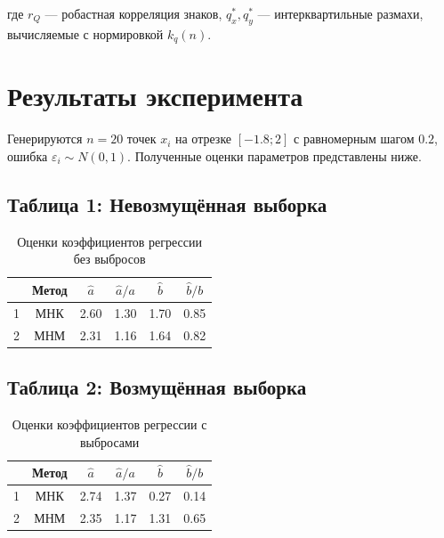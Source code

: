\documentclass[a4paper]{article}
\begin{document}
    где $r_Q$ — робастная корреляция знаков, $q_x^*, q_y^*$ — интерквартильные размахи, вычисляемые с нормировкой $k_q(n)$.


    \section{Результаты эксперимента}

    Генерируются $n=20$ точек $x_i$ на отрезке $[-1.8; 2]$ с равномерным шагом $0.2$, ошибка $\varepsilon_i \sim N(0, 1)$. Полученные оценки параметров представлены ниже.

    \subsection*{Таблица 1: Невозмущённая выборка}

    \begin{table}[H]
        \centering
        \begin{tabular}{|c|c|c|c|c|c|}
            \hline
            & Метод & $\hat{a}$ & $\hat{a}/a$ & $\hat{b}$ & $\hat{b}/b$ \\
            \hline
            1 & МНК   & 2.60      & 1.30        & 1.70      & 0.85        \\
            2 & МНМ   & 2.31      & 1.16        & 1.64      & 0.82        \\
            \hline
        \end{tabular}
        \caption{Оценки коэффициентов регрессии без выбросов}
    \end{table}

    \subsection*{Таблица 2: Возмущённая выборка}

    \begin{table}[H]
        \centering
        \begin{tabular}{|c|c|c|c|c|c|}
            \hline
            & Метод & $\hat{a}$ & $\hat{a}/a$ & $\hat{b}$ & $\hat{b}/b$ \\
            \hline
            1 & МНК   & 2.74      & 1.37        & 0.27      & 0.14        \\
            2 & МНМ   & 2.35      & 1.17        & 1.31      & 0.65        \\
            \hline
        \end{tabular}
        \caption{Оценки коэффициентов регрессии с выбросами}
    \end{table}
\end{document}
